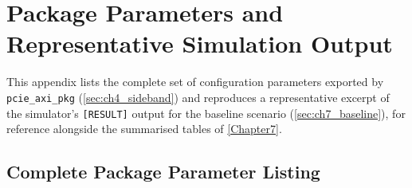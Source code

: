 
\chapter{Package Parameters and Representative Simulation Output}

\label{AppendixA}


This appendix lists the complete set of configuration parameters exported by \texttt{pcie\_axi\_pkg} (\autoref{sec:ch4_sideband}) and reproduces a representative excerpt of the simulator's \texttt{[RESULT]} output for the baseline scenario (\autoref{sec:ch7_baseline}), for reference alongside the summarised tables of \autoref{Chapter7}.

\section{Complete Package Parameter Listing}
\label{sec:appA_params}

